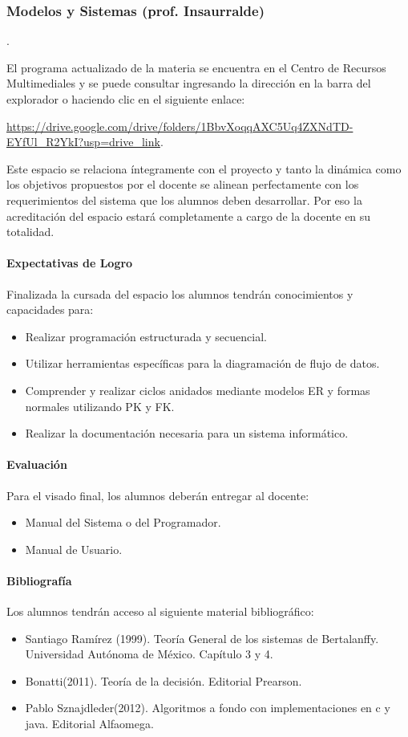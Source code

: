 \subsubsection{Modelos y Sistemas (prof. Insaurralde)}.

El programa actualizado de la materia se encuentra en el Centro de Recursos Multimediales y se puede consultar ingresando la dirección en la barra del explorador o haciendo clic en el siguiente enlace:

\url{https://drive.google.com/drive/folders/1BbvXoqqAXC5Uq4ZXNdTD-EYfUl_R2YkI?usp=drive_link}.

Este espacio se relaciona íntegramente con el proyecto y tanto la dinámica como los objetivos propuestos por el docente se alinean perfectamente con los requerimientos del sistema que los alumnos deben desarrollar. Por eso la acreditación del espacio estará completamente a cargo de la docente en su totalidad.

\paragraph{Expectativas de Logro} Finalizada la cursada del espacio los alumnos tendrán conocimientos y capacidades para:

\begin{itemize}
    \item Realizar programación estructurada y secuencial. 
    \item Utilizar herramientas específicas para la diagramación de flujo de datos.
    \item Comprender y realizar ciclos anidados mediante modelos ER y formas normales utilizando PK y FK.
    \item Realizar la documentación necesaria para un sistema informático.
\end{itemize}

\paragraph{Evaluación} Para el visado final, los alumnos deberán entregar al docente:
\begin{itemize}
    \item Manual del Sistema o del Programador.
    \item Manual de Usuario.
\end{itemize}

\paragraph{Bibliografía} Los alumnos tendrán acceso al siguiente material bibliográfico:

\begin{itemize}
    \item Santiago Ramírez (1999). Teoría General de los sistemas de Bertalanffy. Universidad Autónoma de México. Capítulo 3 y 4.
    \item Bonatti(2011). Teoría de la decisión. Editorial Prearson.
    \item Pablo Sznajdleder(2012). Algoritmos a fondo con implementaciones en c y java. Editorial Alfaomega.
\end{itemize}

